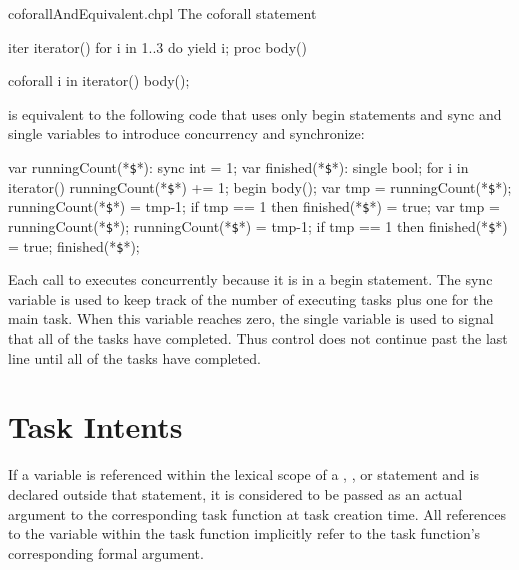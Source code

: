 \begin{chapelexample}{coforallAndEquivalent.chpl}
The coforall statement
\begin{chapelpre}
iter iterator() { for i in 1..3 do yield i; }
proc body() { }
\end{chapelpre}
\begin{chapel}
coforall i in iterator() {
  body();
}
\end{chapel}
is equivalent to the following code that uses only begin statements
and sync and single variables to introduce concurrency and
synchronize:
\begin{chapel}
var runningCount(*\texttt{\$}*): sync int = 1;
var finished(*\texttt{\$}*): single bool;
for i in iterator() {
  runningCount(*\texttt{\$}*) += 1;
  begin {
    body();
    var tmp = runningCount(*\texttt{\$}*);
    runningCount(*\texttt{\$}*) = tmp-1;
    if tmp == 1 then finished(*\texttt{\$}*) = true;
  }
}
var tmp = runningCount(*\texttt{\$}*);
runningCount(*\texttt{\$}*) = tmp-1;
if tmp == 1 then finished(*\texttt{\$}*) = true;
finished(*\texttt{\$}*);
\end{chapel}
\begin{chapeloutput}
\end{chapeloutput}
Each call to  executes concurrently because it is in a
begin statement.  The sync
variable  is used to keep track
of the number of executing tasks plus one for the main task.  When
this variable reaches zero, the single
variable  is used to signal that
all of the tasks have completed.  Thus control does not continue past
the last line until all of the tasks have completed.
\end{chapelexample}


\section{Task Intents}
\label{Task_Intents}

If a variable is referenced within the lexical scope of a
, , or  statement
and is declared outside that statement, it is considered
to be passed as an actual argument to the corresponding task function 
at task creation time. All references to the variable
within the task function implicitly refer to the task function's
corresponding formal argument.

